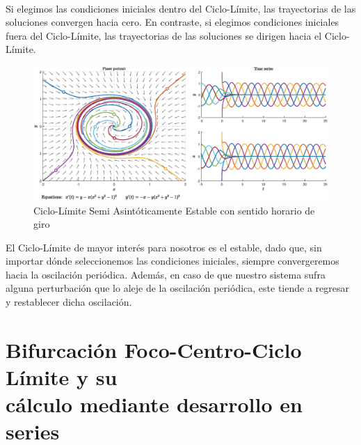 \documentclass[12pt,a4paper]{report} %
\begin{document}
	\newpage
	
	\vspace{0.5cm}\\[0.5cm]
	
	Si elegimos las condiciones iniciales dentro del Ciclo-Límite, las trayectorias de las soluciones convergen hacia cero. En contraste, si elegimos condiciones iniciales fuera del Ciclo-Límite, las trayectorias de las soluciones se dirigen hacia el Ciclo-Límite.
	
	\begin{figure}[h]
		\centering
		\includegraphics[width=1\textwidth]{clpe.eps}
		\caption{Ciclo-Límite Semi Asintóticamente Estable con sentido horario de giro}
		\label{fig:clpe}
	\end{figure}\smallskip
	
	\vspace{0.5cm}\noindent El Ciclo-Límite de mayor interés para nosotros es el estable, dado que, sin importar dónde seleccionemos las condiciones iniciales, siempre convergeremos hacia la oscilación periódica. Además, en caso de que nuestro sistema sufra alguna perturbación que lo aleje de la oscilación periódica, este tiende a regresar y restablecer dicha oscilación.
	
	\newpage
	
	\section{Bifurcación Foco-Centro-Ciclo Límite y su\\ cálculo mediante desarrollo en series}
	
\end{document}
